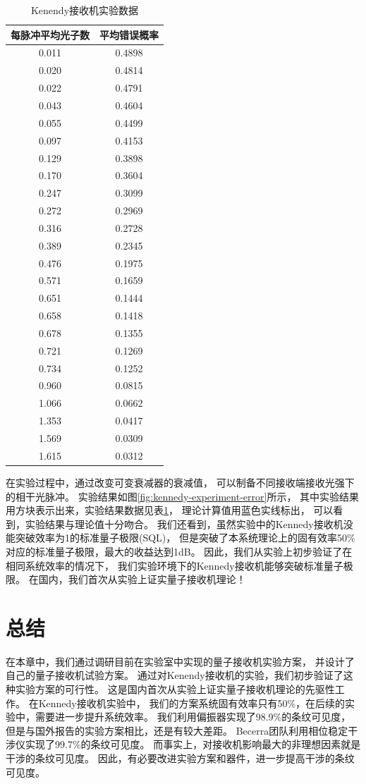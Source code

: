 \begin{table}
\caption{Kenendy接收机实验数据}
\label{tab:exp-data}
\centering
\begin{tabular}{cc}
\hline
每脉冲平均光子数 & 平均错误概率 \\
\hline
0.011 & 0.4898 \\ 
0.020 & 0.4814 \\ 
0.022 & 0.4791 \\ 
0.043 & 0.4604 \\ 
0.055 & 0.4499 \\ 
0.097 & 0.4153 \\ 
0.129 & 0.3898 \\ 
0.170 & 0.3604 \\ 
0.247 & 0.3099 \\ 
0.272 & 0.2969 \\ 
0.316 & 0.2728 \\ 
0.389 & 0.2345 \\ 
0.476 & 0.1975 \\ 
0.571 & 0.1659 \\ 
0.651 & 0.1444 \\ 
0.658 & 0.1418 \\ 
0.678 & 0.1355 \\ 
0.721 & 0.1269 \\ 
0.734 & 0.1252 \\ 
0.960 & 0.0815 \\ 
1.066 & 0.0662 \\ 
1.353 & 0.0417 \\ 
1.569 & 0.0309 \\ 
1.615 & 0.0312 \\ 
\hline
\end{tabular}
\end{table}


在实验过程中，通过改变可变衰减器的衰减值，
可以制备不同接收端接收光强下的相干光脉冲。
实验结果如图\ref{fig:kennedy-experiment-error}所示，
其中实验结果用方块表示出来，实验结果数据见表\ref{tab:exp-data}，
理论计算值用蓝色实线标出，
可以看到，实验结果与理论值十分吻合。
我们还看到，虽然实验中的Kennedy接收机没能突破效率为1的标准量子极限(SQL)，
但是突破了本系统理论上的固有效率50\%对应的标准量子极限，最大的收益达到1dB。
因此，我们从实验上初步验证了在相同系统效率的情况下，
我们实验环境下的Kennedy接收机能够突破标准量子极限。
在国内，我们首次从实验上证实量子接收机理论！


\section{总结}
在本章中，我们通过调研目前在实验室中实现的量子接收机实验方案，
并设计了自己的量子接收机试验方案。
通过对Kenendy接收机的实验，我们初步验证了这种实验方案的可行性。
这是国内首次从实验上证实量子接收机理论的先驱性工作。
在Kennedy接收机实验中，
我们的方案系统固有效率只有50\%，在后续的实验中，需要进一步提升系统效率。
我们利用偏振器实现了98.9\%的条纹可见度，
但是与国外报告的实验方案相比，还是有较大差距。
Becerra团队利用相位稳定干涉仪实现了99.7\%的条纹可见度\cite{becerra2013experimental}。
而事实上，对接收机影响最大的非理想因素就是干涉的条纹可见度\cite{li2013suppressing}。
因此，有必要改进实验方案和器件，进一步提高干涉的条纹可见度。

